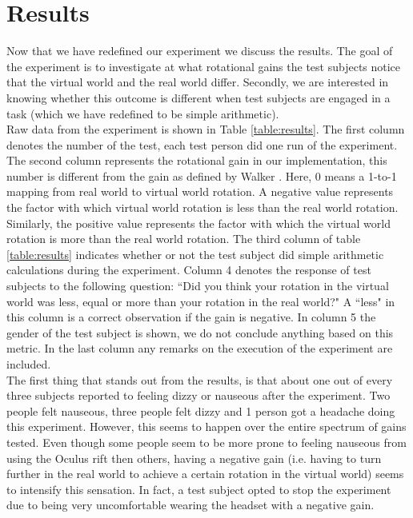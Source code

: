 \section{Results}
Now that we have redefined our experiment we discuss the results.
The goal of the experiment is to investigate at what rotational gains the test subjects notice that the virtual world and the real world differ.
Secondly, we are interested in knowing whether this outcome is different when test subjects are engaged in a task (which we have redefined to be simple arithmetic).\\

Raw data from the experiment is shown in Table \ref{table:results}.
The first column denotes the number of the test, each test person did one run of the experiment.
The second column represents the rotational gain in our implementation, this number is different from the gain as defined by Walker \cite{jwalker}.
Here, 0 means a 1-to-1 mapping from real world to virtual world rotation.
A negative value represents the factor with which virtual world rotation is less than the real world rotation.
Similarly, the positive value represents the factor with which the virtual world rotation is more than the real world rotation.
The third column of table \ref{table:results} indicates whether or not the test subject did simple arithmetic calculations during the experiment.
Column 4 denotes the response of test subjects to the following question: ``Did you think your rotation in the virtual world was less, equal or more than your rotation in the real world?"
A ``less" in this column is a correct observation if the gain is negative.
In column 5 the gender of the test subject is shown, we do not conclude anything based on this metric.
In the last column any remarks on the execution of the experiment are included.\\

The first thing that stands out from the results, is that about one out of every three subjects reported to feeling dizzy or nauseous after the experiment.
Two people felt nauseous, three people felt dizzy and 1 person got a headache doing this experiment.
However, this seems to happen over the entire spectrum of gains tested.
Even though some people seem to be more prone to feeling nauseous from using the Oculus rift then others, having a negative gain (i.e. having to turn further in the real world to achieve a certain rotation in the virtual world) seems to intensify this sensation.
In fact, a test subject opted to stop the experiment due to being very uncomfortable wearing the headset with a negative gain.

